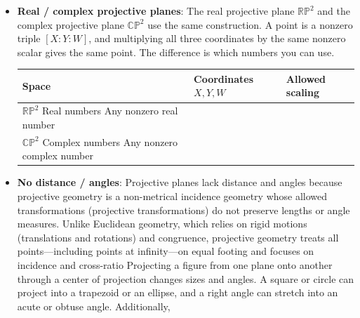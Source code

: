 \documentclass{report}
\begin{document}
\begin{itemize}
            \bigbreak \noindent 
            In homogeneous coordinates \([X:Y:W]\), an ordinary point has \(W\ne 0\), with \(x=X/W\) and \(y=Y/W\). Substituting and clearing denominators gives the projective equations
            \[
                YW=X^2,
                \qquad
                YW=2X^2-W^2.
            \]
            To find points at infinity, set \(W=0\). Both equations then force \(X=0\), so both parabolas pass through \([0:1:0]\). Geometrically, this is the vertical direction.
        \item \textbf{Real / complex projective planes}: The real projective plane \(\mathbb{RP}^2\) and the complex projective plane \(\mathbb{CP}^2\) use the same construction. A point is a nonzero triple \([X:Y:W]\), and multiplying all three coordinates by the same nonzero scalar gives the same point. The difference is which numbers you can use.
            \begin{center}
                \begin{tabularx}{\textwidth}{@{}lXl@{}}
                    \toprule
                    \textbf{Space}  & \textbf{Coordinates \(X,Y,W\)} &  \textbf{Allowed scaling} \\
                    \midrule
                    \(\mathbb{RP}^2\)  Real numbers  Any nonzero real number  \\[2ex]
                    \(\mathbb{CP}^2\)  Complex numbers  Any nonzero complex number \\[2ex]
                    \bottomrule
                \end{tabularx}
            \end{center}
        \item \textbf{No distance / angles}: Projective planes lack distance and angles because projective geometry is a non-metrical incidence geometry whose allowed transformations (projective transformations) do not preserve lengths or angle measures. Unlike Euclidean geometry, which relies on rigid motions (translations and rotations) and congruence, projective geometry treats all points—including points at infinity—on equal footing and focuses on incidence and cross-ratio
            \bigbreak \noindent 
            Projecting a figure from one plane onto another through a center of projection changes sizes and angles.
            \bigbreak \noindent 
            A square or circle can project into a trapezoid or an ellipse, and a right angle can stretch into an acute or obtuse angle.
            \bigbreak \noindent 
            Additionally,
            \begin{itemize}

\end{itemize}
\end{itemize}
\end{document}
